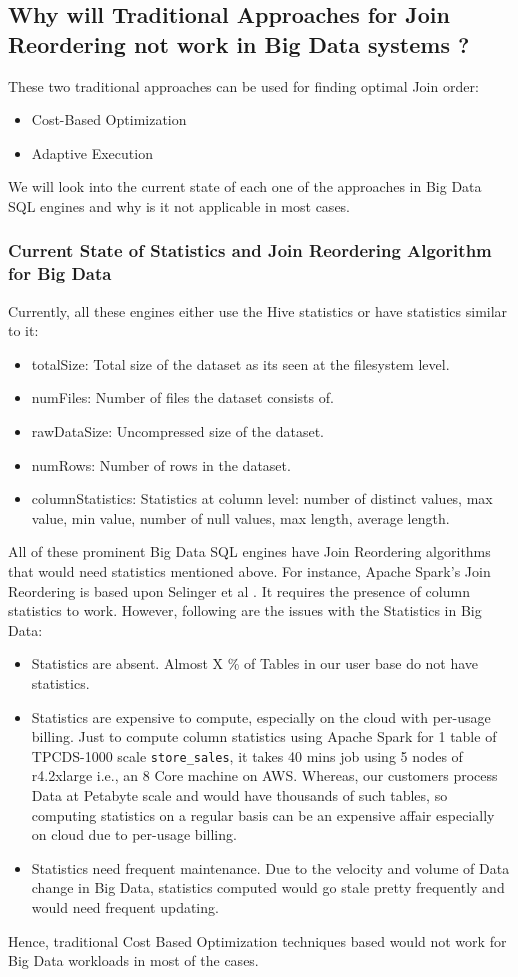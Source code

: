 \subsection{Why will Traditional Approaches for Join Reordering not work in Big Data systems ?}
These two traditional approaches can be used for finding optimal Join order:
\begin{itemize}
\item Cost-Based Optimization
\item Adaptive Execution
\end{itemize}

We will look into the current state of each one of the approaches in Big Data SQL engines and why is it not applicable in most cases.

\subsubsection{Current State of Statistics and Join Reordering Algorithm for Big Data}

Currently, all these engines either use the Hive statistics or have statistics similar to it:
\begin{itemize}
\item totalSize: Total size of the dataset as its seen at the filesystem level.
\item numFiles: Number of files the dataset consists of.
\item rawDataSize: Uncompressed size of the dataset.
\item numRows: Number of rows in the dataset.
\item columnStatistics: Statistics at column level: number of distinct values, max value, min value, number of null values, max length, average length.
\end{itemize}

All of these prominent Big Data SQL engines have Join Reordering algorithms that would need statistics mentioned above. For instance, Apache Spark's Join Reordering is based upon Selinger et al \cite{b1}. It requires the presence of column statistics to work. However, following are the issues with the Statistics in Big Data:

\begin{itemize}
\item Statistics are absent. Almost X \% of Tables in our user base do not have statistics.
\item Statistics are expensive to compute, especially on the cloud with per-usage billing. Just to compute column statistics using Apache Spark for 1 table of TPCDS-1000 scale \texttt{store\_sales}, it takes 40 mins job using 5 nodes of r4.2xlarge i.e., an 8 Core machine on AWS. Whereas, our customers process Data at Petabyte scale and would have thousands of such tables, so computing statistics on a regular basis can be an expensive affair especially on cloud due to per-usage billing.
\item Statistics need frequent maintenance. Due to the velocity and volume of Data change in Big Data, statistics computed would go stale pretty frequently and would need frequent updating.
\end{itemize}

Hence, traditional Cost Based Optimization techniques based would not work for Big Data workloads in most of the cases.


